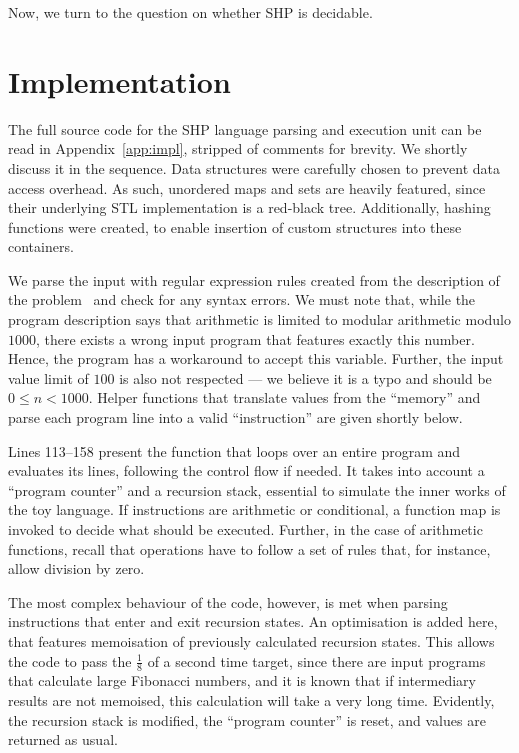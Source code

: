 \documentclass[12pt]{article}
\begin{document}
Now, we turn to the question on whether SHP is decidable. 

\section{Implementation}\label{sec:imp}

The full source code for the SHP language parsing and execution unit can be read in Appendix~\ref{app:impl}, stripped of comments for brevity. We shortly discuss it in the sequence. Data structures were carefully chosen to prevent data access overhead. As such, unordered maps and sets are heavily featured, since their underlying STL implementation is a red-black tree. Additionally, hashing functions were created, to enable insertion of custom structures into these containers. 

We parse the input with regular expression rules created from the description of the problem~\cite{Demasi:misc:2013:may} and check for any syntax errors. We must note that, while the program description says that arithmetic is limited to modular arithmetic modulo $1000$, there exists a wrong input program that features exactly this number. Hence, the program has a workaround to accept this variable. Further, the input value limit of $100$ is also not respected --- we believe it is a typo and should be $0 \leq n < 1000$. Helper functions that translate values from the ``memory'' and parse each program line into a valid ``instruction'' are given shortly below.

Lines 113--158 present the function that loops over an entire program and evaluates its lines, following the control flow if needed. It takes into account a ``program counter'' and a recursion stack, essential to simulate the inner works of the toy language. If instructions are arithmetic or conditional, a function map is invoked to decide what should be executed. Further, in the case of arithmetic functions, recall that operations have to follow a set of rules that, for instance, allow division by zero.

The most complex behaviour of the code, however, is met when parsing instructions that enter and exit recursion states. An optimisation is added here, that features memoisation of previously calculated recursion states. This allows the code to pass the $\frac{1}{8}$ of a second time target, since there are input programs that calculate large Fibonacci numbers, and it is known that if intermediary results are not memoised, this calculation will take a very long time. Evidently, the recursion stack is modified, the ``program counter'' is reset, and values are returned as usual.
\end{document}
